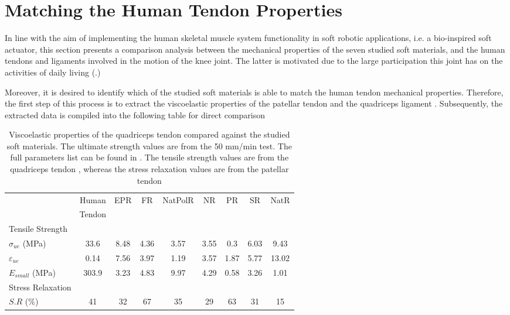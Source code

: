 \section{Matching the Human Tendon Properties}

In line with the aim of implementing the human skeletal muscle system functionality in soft robotic applications, i.e. a bio-inspired soft actuator, this section presents a comparison analysis between the mechanical properties of the seven studied soft materials, and the human tendons and ligaments involved in the motion of the knee joint. The latter is motivated due to the large participation this joint has on the activities of daily living (.) 

Moreover, it is desired to identify which of the studied soft materials is able to match the human tendon mechanical properties. Therefore, the first step of this process is to extract the viscoelastic properties of the patellar tendon and the quadriceps ligament \cite{schatzmann1998effect,staubli1999mechanical,johnson1994tensile}. Subsequently, the extracted data is compiled into the following table for direct comparison

\begin{table}[htbp!]
    \centering
    \caption{Viscoelastic properties of the quadriceps tendon compared against the studied soft materials. The ultimate strength values are from the 50 mm/min test. The full parameters list can be found in . The tensile strength values are from the quadriceps tendon \cite{schatzmann1998effect}, whereas the stress relaxation values are from the patellar tendon \cite{johnson1994tensile}}
    \begin{tabular}{lcccccccc}
    \toprule
    & Human & EPR & FR & NatPolR & NR & PR & SR & NatR \\
    & Tendon \\
    \hline
    Tensile Strength \\
    \hline
    $\sigma_{ue}$ (MPa)     & 33.6   & 8.48 & 4.36  & 3.57  & 3.55  & 0.3   & 6.03  & 9.43  \\
    $\varepsilon_{ue}$      & 0.14   & 7.56 & 3.97  & 1.19  & 3.57  & 1.87  & 5.77  & 13.02  \\
    $E_{small}$ (MPa)   & 303.9  & 3.23 & 4.83  & 9.97  & 4.29  & 0.58  & 3.26  & 1.01  \\
    \midrule
    Stress Relaxation  \\
    \hline
    $S.R$ (\%)                          & 41     & 32    & 67   & 35    & 29    & 63    & 31    & 15\\
    \bottomrule
    \end{tabular}
    \label{tbl:tendon&soft}
\end{table}

